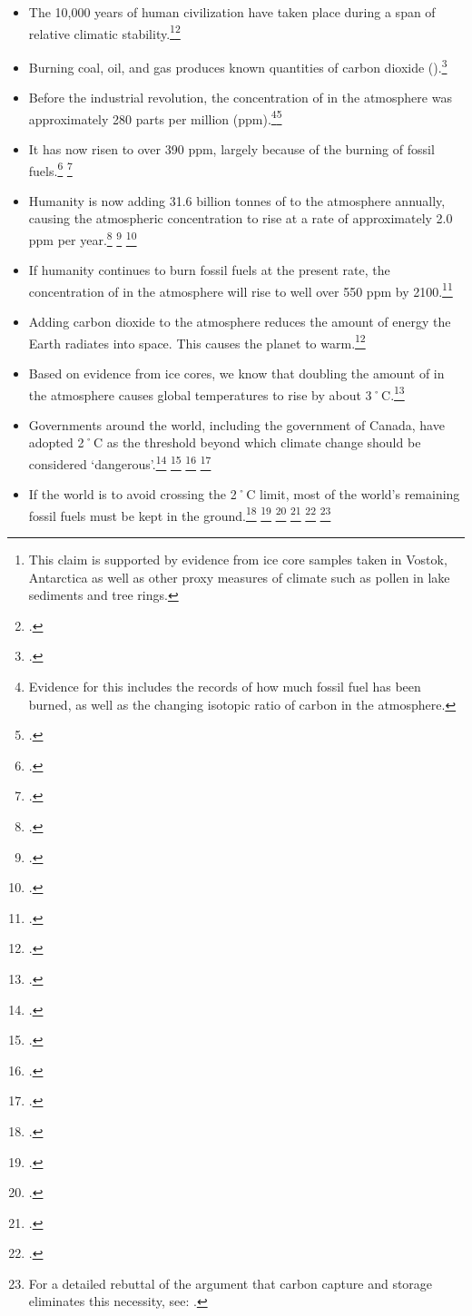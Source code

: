 \begin{itemize}
	\item The 10,000 years of human civilization have taken place during a span of relative climatic stability.\footnote{This claim is supported by evidence from ice core samples taken in Vostok, Antarctica as well as other proxy measures of climate such as pollen in lake sediments and tree rings.}\footcite[][p. 4]{Alley2000}
	\item Burning coal, oil, and gas produces known quantities of carbon dioxide ().\footcite[For example, the U.S. Environmental Protection Agency lists quantities of  produced by burning a barrel of oil, metric tonne of coal, or therm (100,000 British thermal units) of natural gas:][]{CalculationsReferences}
	\item Before the industrial revolution, the concentration of  in the atmosphere was approximately 280 parts per million (ppm).\footnote{Evidence for this includes the records of how much fossil fuel has been burned, as well as the changing isotopic ratio of carbon in the atmosphere.}\footcite[][]{IPCC4ARdrivers}
	\item It has now risen to over 390 ppm, largely because of the burning of fossil fuels.\footcite[][]{KeelingExplanation} \footcite[][p. xiv]{WorldBank4C}
	\item Humanity is now adding 31.6 billion tonnes of  to the atmosphere annually, causing the atmospheric concentration to rise at a rate of approximately 2.0 ppm per year.\footcite[][]{RedrawingClimateEnergy} \footcite[][]{NOAATrends} \footcite[See also: ][]{FaustianGrowth}
	\item If humanity continues to burn fossil fuels at the present rate, the concentration of  in the atmosphere will rise to well over 550 ppm by 2100.\footcite[][]{IPCCCO2proj}
	\item Adding carbon dioxide to the atmosphere reduces the amount of energy the Earth radiates into space. This causes the planet to warm.\footcite[][]{IPCC4ARdrivers}
	\item Based on evidence from ice cores, we know that doubling the amount of  in the atmosphere causes global temperatures to rise by about 3˚C.\footcite[][p. 473]{SafeOperatingSpace}
	\item Governments around the world, including the government of Canada, have adopted 2˚C as the threshold beyond which climate change should be considered `dangerous'.\footcite{CopenhagenAccord} \footcite[][p. 5]{CriticalDecade2013} \footcite[See also: ][p. 473]{SafeOperatingSpace} \footcite[See also: ][]{EmGapReport}
	\item If the world is to avoid crossing the 2˚C limit, most of the world's remaining fossil fuels must be kept in the ground.\footcite[][]{IEA2012} \footcite[][]{EconomistUnburnable} \footcite[][]{TerrifyingNewMath} \footcite[The Australian government's Climate Commission states that most fossil fuels must be left in the ground and cannot be burned ][p. 5]{CriticalDecade2013} \footcite[][]{ChallengeTwoDegrees} \footnote{For a detailed rebuttal of the argument that carbon capture and storage eliminates this necessity, see: .}
\end{itemize}


